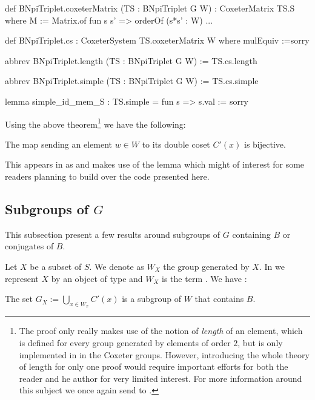 \begin{leancode}
def BNpiTriplet.coxeterMatrix  (TS : BNpiTriplet G W) : CoxeterMatrix TS.S where
  M := Matrix.of fun s s' => orderOf (s*s' : W)
  ...

def  BNpiTriplet.cs : CoxeterSystem TS.coxeterMatrix W where
  mulEquiv :=sorry

abbrev BNpiTriplet.length (TS : BNpiTriplet G W) := TS.cs.length

abbrev BNpiTriplet.simple (TS : BNpiTriplet G W) := TS.cs.simple

lemma simple_id_mem_S : TS.simple = fun s => s.val := sorry
\end{leancode}

Using the above theorem\footnote{The proof only really makes use of the notion of \emph{length} of an element, which is defined for every group generated by elements of order $2$, but is only implemented in \Lean in the Coxeter groups. However, introducing the whole theory of length for only one proof would require  important efforts for both the reader and he author for very limited interest. For more information around this subject we once again send to \cite{bourbaki_groupes_2007}.} we have the following: 

\begin{lemme}
    The map sending an element $w \in W$ to its double coset $C'\left( x \right)$ is bijective.
\end{lemme}

This appears in \Lean as  and makes use of the lemma  which might of interest for some readers planning to build over the code presented here.

\subsection{Subgroups of $G$}

This subsection present a few results around subgroups of $G$ containing $B$ or conjugates of $B$.

Let $X$ be a subset of $S$. We denote as $W_X$ the group generated by $X$. In \Lean  we represent $X$ by an object  of type  and $W_X$ is the term . We have :
\begin{theoreme} 
    The set $G_X := \bigcup_{x \in W_x} C'\left( x \right)$ is a subgroup of $W$ that contains $B$.
\end{theoreme}

